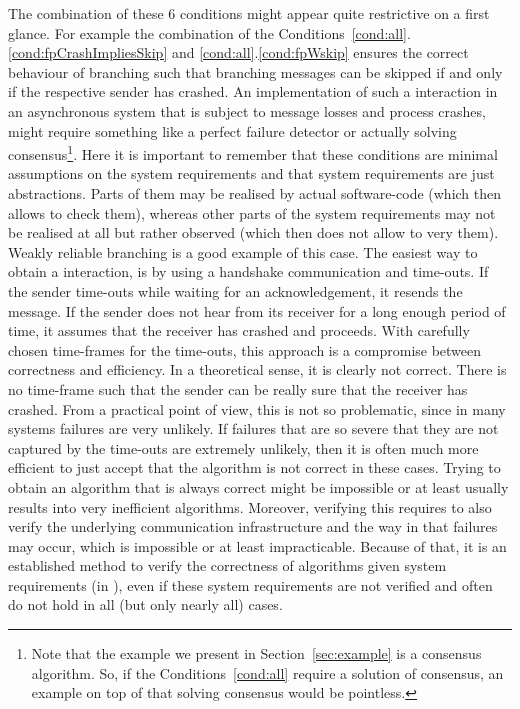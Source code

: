 The combination of these 6 conditions might appear quite restrictive on a first glance.
For example the combination of the Conditions~\ref{cond:all}.\ref{cond:fpCrashImpliesSkip} and \ref{cond:all}.\ref{cond:fpWskip} ensures the correct behaviour of \weakR branching such that branching messages can be skipped if and only if the respective sender has crashed.
An implementation of such a \weakR interaction in an asynchronous system that is subject to message losses and process crashes, might require something like a perfect failure detector or actually solving consensus\footnote{Note that the example we present in Section~\ref{sec:example} is a consensus algorithm. So, if the Conditions~\ref{cond:all} require a solution of consensus, an example on top of that solving consensus would be pointless.}.
Here it is important to remember that these conditions are minimal assumptions on the system requirements and that system requirements are just abstractions.
Parts of them may be realised by actual software-code (which then allows to check them), whereas other parts of the system requirements may not be realised at all but rather observed (which then does not allow to very them).
Weakly reliable branching is a good example of this case.
The easiest way to obtain a \weakR interaction, is by using a handshake communication and time-outs.
If the sender time-outs while waiting for an acknowledgement, it resends the message.
If the sender does not hear from its receiver for a long enough period of time, it assumes that the receiver has crashed and proceeds.
With carefully chosen time-frames for the time-outs, this approach is a compromise between correctness and efficiency.
In a theoretical sense, it is clearly not correct.
There is no time-frame such that the sender can be really sure that the receiver has crashed.
From a practical point of view, this is not so problematic, since in many systems failures are very unlikely.
If failures that are so severe that they are not captured by the time-outs are extremely unlikely, then it is often much more efficient to just accept that the algorithm is not correct in these cases.
Trying to obtain an algorithm that is always correct might be impossible or at least usually results into very inefficient algorithms.
Moreover, verifying this requires to also verify the underlying communication infrastructure and the way in that failures may occur, which is impossible or at least impracticable.
Because of that, it is an established method to verify the correctness of algorithms \wrt given system requirements (\eg in \cite{ChandraToueg96,Lamport01,TanenbaumSteen17}), even if these system requirements are not verified and often do not hold in all (but only nearly all) cases.

